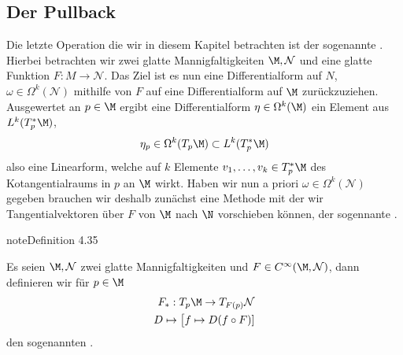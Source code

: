 \documentclass[letterpaper,10pt,english]{jupyterBook}
\begin{document}
\subsection{Der Pullback}
\label{\detokenize{manifolds/diffformen:der-pullback}}
\sphinxAtStartPar
Die letzte Operation die wir in diesem Kapitel betrachten ist der sogenannte . Hierbei betrachten wir zwei glatte Mannigfaltigkeiten \(\M,\mathcal{N}\) und eine glatte Funktion \(F:M\to\mathcal{N}\). Das Ziel ist es nun eine Differentialform auf \(N\), \(\omega\in\Omega^k(\mathcal{N})\) mithilfe von \(F\) auf eine Differentialform auf \(\M\) zurückzuziehen. Ausgewertet an \(p\in\M\) ergibt eine Differentialform \(\eta\in\Omega^k(\M)\) ein Element aus \(L^k(T_p^\ast\M)\),
\begin{equation*}
\begin{split}\eta_p\in \Omega^k(T_p\M) \subset L^k(T_p^\ast\M)\end{split}
\end{equation*}
\sphinxAtStartPar
also eine Linearform, welche auf \(k\) Elemente \(v_1,\ldots,v_k\in T_p^\ast\M\) des Kotangentialraums in \(p\) an \(\M\) wirkt. Haben wir nun a priori \(\omega\in\Omega^k(\mathcal{N})\) gegeben brauchen wir deshalb zunächst eine Methode mit der wir Tangentialvektoren über \(F\) von \(\M\) nach \(\N\) vorschieben können, der sogennante .
\label{manifolds/diffformen:definition-12}
\begin{sphinxadmonition}{note}{Definition 4.35}



\sphinxAtStartPar
Es seien \(\M,\mathcal{N}\) zwei glatte Mannigfaltigkeiten und \(F\in C^\infty(\M,\mathcal{N})\), dann definieren wir für \(p\in\M\)
\begin{equation*}
\begin{split}F_\ast:T_p\M\to T_{F(p)}\mathcal{N}\\
D\mapsto \big[f\mapsto D(f\circ F)]\end{split}
\end{equation*}
\sphinxAtStartPar
den sogenannten .
\end{sphinxadmonition}
\end{document}

